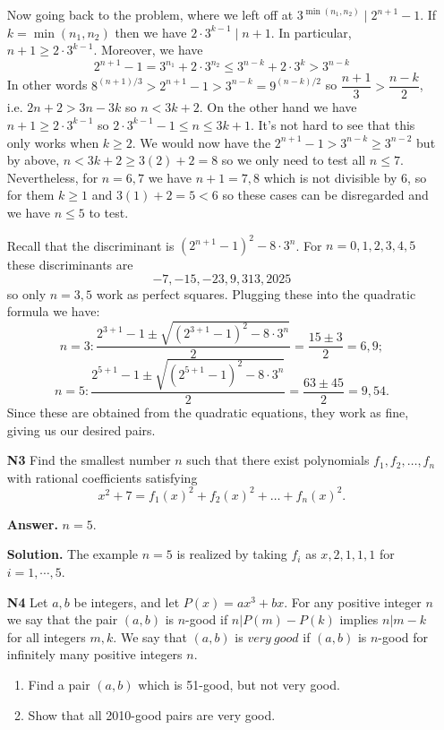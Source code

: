\documentclass[11pt]{article}
\newcommand{\<}{\langle}
\renewcommand{\>}{\rangle}
\begin{document}
\begin{enumerate}
	Now going back to the problem, where we left off at $3^{\min(n_1, n_2)}\mid 2^{n+1}-1$. If $k=\min(n_1, n_2)$ then we have $2\cdot 3^{k-1}\mid n+1$. In particular, $n+1\ge 2\cdot 3^{k-1}$.  Moreover, we have 
	\[2^{n+1}-1= 3^{n_1}+2\cdot 3^{n_2}\le 3^{n-k}+2\cdot 3^k > 3^{n-k}
	\]
	In other words $8^{(n+1)/3}>2^{n+1}-1 > 3^{n-k}=9^{(n-k)/2}$ so $\dfrac{n+1}{3}> \dfrac{n-k}{2}$, i.e. $2n+2> 3n-3k$ so $n<3k+2$. On the other hand we have $n+1\ge 2\cdot 3^{k-1}$ so $2\cdot 3^{k-1} -1 \le n\le 3k+1$. It's not hard to see that this only works when $k\ge 2$. We would now have the $2^{n+1}-1>3^{n-k}\ge 3^{n-2}$ but by above, $n<3k+2\ge 3(2)+2=8$ so we only need to test all $n\le 7$. Nevertheless, for $n=6, 7$ we have $n+1=7, 8$ which is not divisible by 6, so for them $k\ge 1$ and $3(1)+2=5<6$ so these cases can be disregarded and we have $n\le 5$ to test. 
	
	Recall that the discriminant is $(2^{n+1}-1)^2-8\cdot 3^n$. 
	For $n=0, 1, 2, 3, 4, 5$ these discriminants are \[-7, -15, -23, 9, 313, 2025\] 
	so only $n=3, 5$ work as perfect squares. Plugging these into the quadratic formula we have: 
	\[
	n=3: \dfrac{2^{3+1}-1 \pm \sqrt{(2^{3+1}-1)^2 - 8\cdot 3^n}}{2} = \dfrac{15\pm 3}{2}=6, 9;\]\[
	n = 5: \dfrac{2^{5+1}-1 \pm \sqrt{(2^{5+1}-1)^2 - 8\cdot 3^n}}{2} = \dfrac{63\pm 45}{2} = 9, 54. 
	\]
	Since these are obtained from the quadratic equations, they work as fine, giving us our desired pairs. 
	
	\item[\textbf{N3}] 
	Find the smallest number $n$ such that there exist polynomials $f_1, f_2, \ldots , f_n$ with rational coefficients satisfying\[x^2+7 = f_1\left(x\right)^2 + f_2\left(x\right)^2 + \ldots + f_n\left(x\right)^2.\]
	
	\textbf{Answer.} $n = 5$. 
	
	\textbf{Solution.} The example $n = 5$ is realized by taking $f_i$ as $x, 2, 1, 1, 1$
	for $i=1, \cdots, 5$. 
	
	\item [\textbf{N4}]Let $a, b$ be integers, and let $P(x) = ax^3+bx.$ For any positive integer $n$ we say that the pair $(a,b)$ is $n$-good if $n | P(m)-P(k)$ implies $n | m - k$ for all integers $m, k.$ We say that $(a,b)$ is $very \ good$ if $(a,b)$ is $n$-good for infinitely many positive integers $n.$
	\begin{enumerate}
		\item Find a pair $(a,b)$ which is 51-good, but not very good.
		\item Show that all 2010-good pairs are very good.
		\end{enumerate}
	

\end{enumerate}
\end{document}

